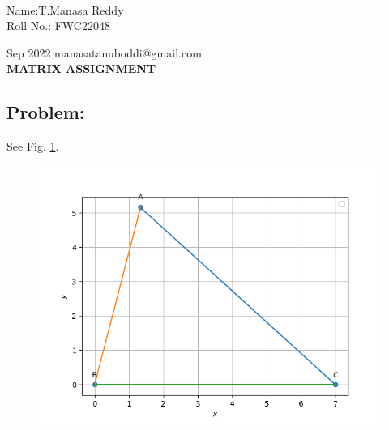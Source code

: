 \documentclass[10pt,a4paper]{report}
\begin{document}
 \vspace{3mm}\\ \raggedleft Name:T.Manasa Reddy\vspace{2mm}\\ \raggedleft Roll No.: FWC22048\vspace{2mm}\\ \raggedright Sep 2022 \hspace{12cm} \raggedleft manasatanuboddi@gmail.com \vspace{10mm}
\\ \centering \Large \textbf{MATRIX ASSIGNMENT} \normalsize \vspace{15mm}

\begin{multicols}{2}
\section{Problem:}  
\fi
	\iffalse
	See Fig. 
		\ref{eq:cons/tri/9/11/2/1}.
	\begin{figure}[!h]
		\centering
 \includegraphics[width=\columnwidth]{chapters/9/11/2/1/figs/Figure_1.png}
		\caption{}
		\label{eq:cons/tri/9/11/2/1}
  	\end{figure}
	
	\vspace{3mm}

\end{multicols}
\end{document}
